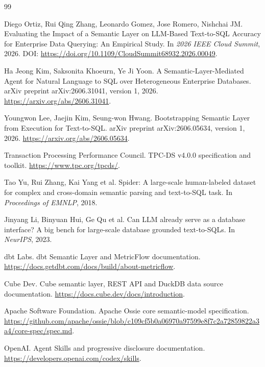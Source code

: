 \documentclass[UTF8,a4paper,12pt]{ctexart}
\begin{document}
\begin{thebibliography}{99}

Diego Ortiz, Rui Qing Zhang, Leonardo Gomez, Jose Romero, Nishchai JM.
\newblock Evaluating the Impact of a Semantic Layer on LLM-Based Text-to-SQL Accuracy for Enterprise Data Querying: An Empirical Study.
\newblock In \emph{2026 IEEE Cloud Summit}, 2026.
\newblock DOI: \url{https://doi.org/10.1109/CloudSummit68932.2026.00049}.

Ha Jeong Kim, Saksonita Khoeurn, Ye Ji Yoon.
\newblock A Semantic-Layer-Mediated Agent for Natural Language to SQL over Heterogeneous Enterprise Databases.
\newblock arXiv preprint arXiv:2606.31041, version 1, 2026.
\newblock \url{https://arxiv.org/abs/2606.31041}.

Youngwon Lee, Jaejin Kim, Seung-won Hwang.
\newblock Bootstrapping Semantic Layer from Execution for Text-to-SQL.
\newblock arXiv preprint arXiv:2606.05634, version 1, 2026.
\newblock \url{https://arxiv.org/abs/2606.05634}.

Transaction Processing Performance Council.
\newblock TPC-DS v4.0.0 specification and toolkit.
\newblock \url{https://www.tpc.org/tpcds/}.

Tao Yu, Rui Zhang, Kai Yang et al.
\newblock Spider: A large-scale human-labeled dataset for complex and cross-domain semantic parsing and text-to-SQL task.
\newblock In \emph{Proceedings of EMNLP}, 2018.

Jinyang Li, Binyuan Hui, Ge Qu et al.
\newblock Can LLM already serve as a database interface? A big bench for large-scale database grounded text-to-SQLs.
\newblock In \emph{NeurIPS}, 2023.

dbt Labs.
\newblock dbt Semantic Layer and MetricFlow documentation.
\newblock \url{https://docs.getdbt.com/docs/build/about-metricflow}.

Cube Dev.
\newblock Cube semantic layer, REST API and DuckDB data source documentation.
\newblock \url{https://docs.cube.dev/docs/introduction}.

Apache Software Foundation.
\newblock Apache Ossie core semantic-model specification.
\newblock \url{https://github.com/apache/ossie/blob/c109cf5b0a06970a97599e8f7c2a72859822a3a4/core-spec/spec.md}.

OpenAI.
\newblock Agent Skills and progressive disclosure documentation.
\newblock \url{https://developers.openai.com/codex/skills}.

\end{thebibliography}
\end{document}
